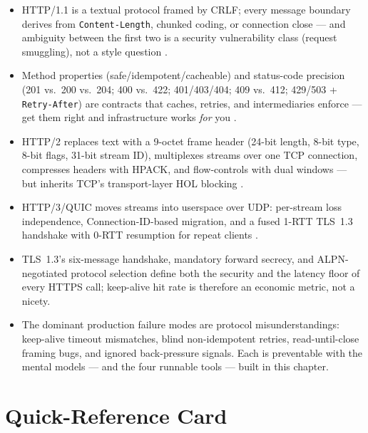 \begin{itemize}
  \item HTTP/1.1 is a textual protocol framed by CRLF; every message boundary derives from \texttt{Content-Length}, chunked coding, or connection close --- and ambiguity between the first two is a security vulnerability class (request smuggling), not a style question \cite{rfc9112}.
  \item Method properties (safe/idempotent/cacheable) and status-code precision (201 vs.\ 200 vs.\ 204; 400 vs.\ 422; 401/403/404; 409 vs.\ 412; 429/503 + \texttt{Retry-After}) are contracts that caches, retries, and intermediaries enforce --- get them right and infrastructure works \emph{for} you \cite{rfc9110}.
  \item HTTP/2 replaces text with a 9-octet frame header (24-bit length, 8-bit type, 8-bit flags, 31-bit stream ID), multiplexes streams over one TCP connection, compresses headers with HPACK, and flow-controls with dual windows --- but inherits TCP's transport-layer HOL blocking \cite{rfc9113,rfc7541}.
  \item HTTP/3/QUIC moves streams into userspace over UDP: per-stream loss independence, Connection-ID-based migration, and a fused 1-RTT TLS~1.3 handshake with 0-RTT resumption for repeat clients \cite{rfc9114,rfc9000,rfc8446}.
  \item TLS~1.3's six-message handshake, mandatory forward secrecy, and ALPN-negotiated protocol selection define both the security and the latency floor of every HTTPS call; keep-alive hit rate is therefore an economic metric, not a nicety.
  \item The dominant production failure modes are protocol misunderstandings: keep-alive timeout mismatches, blind non-idempotent retries, read-until-close framing bugs, and ignored back-pressure signals. Each is preventable with the mental models --- and the four runnable tools --- built in this chapter.
\end{itemize}

\section{Quick-Reference Card}

